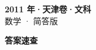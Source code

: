 \documentclass[zihao=-4, a4paper]{ctexart}
\begin{document}
\begin{center}
  {\Large\bfseries 2011 年·天津卷·文科}\\[4pt]
  {\large 数学 · 简答版}
\end{center}
\medskip
{}

\clearpage
{}
\begin{center}{\Large\bfseries 答案速查}\end{center}
\medskip

\end{document}
